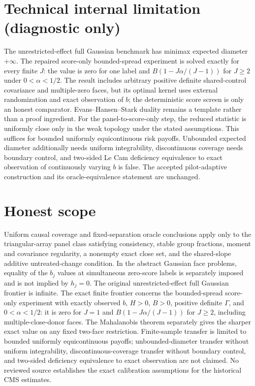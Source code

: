 \documentclass{article}
\begin{document}
\section*{Technical internal limitation (diagnostic only)}

The unrestricted-effect full Gaussian benchmark has minimax expected diameter \(+\infty\). The repaired score-only bounded-spread experiment is solved exactly for every finite \(J\): the value is zero for one label and \(B(1-J\alpha/(J-1))\) for \(J\geq2\) under \(0<\alpha<1/2\). The result includes arbitrary positive definite shared-control covariance and multiple-zero faces, but its optimal kernel uses external randomization and exact observation of \(b\); the deterministic score screen is only an honest comparator. Evans--Hansen--Stark duality remains a template rather than a proof ingredient. For the panel-to-score-only step, the reduced statistic is uniformly close only in the weak topology under the stated assumptions. This suffices for bounded uniformly equicontinuous risk payoffs. Unbounded expected diameter additionally needs uniform integrability, discontinuous coverage needs boundary control, and two-sided Le Cam deficiency equivalence to exact observation of continuously varying \(b\) is false. The accepted pilot-adaptive construction and its oracle-equivalence statement are unchanged.

\section{Honest scope}

Uniform causal coverage and fixed-separation oracle conclusions apply only to the triangular-array panel class satisfying consistency, stable group fractions, moment and covariance regularity, a nonempty exact close set, and the shared-slope additive untreated-change condition. In the abstract Gaussian face problems, equality of the \(b_j\) values at simultaneous zero-score labels is separately imposed and is not implied by \(h_j=0\). The original unrestricted-effect full Gaussian frontier is infinite. The exact finite frontier concerns the bounded-spread score-only experiment with exactly observed \(b\), \(H>0\), \(B>0\), positive definite \(\Gamma\), and \(0<\alpha<1/2\): it is zero for \(J=1\) and \(B(1-J\alpha/(J-1))\) for \(J\geq2\), including multiple-close-donor faces. The Mahalanobis theorem separately gives the sharper exact value on any fixed two-face restriction. Finite-sample transfer is limited to bounded uniformly equicontinuous payoffs; unbounded-diameter transfer without uniform integrability, discontinuous-coverage transfer without boundary control, and two-sided deficiency equivalence to exact observation are not claimed. No reviewed source establishes the exact calibration assumptions for the historical CMS estimates.
\end{document}
